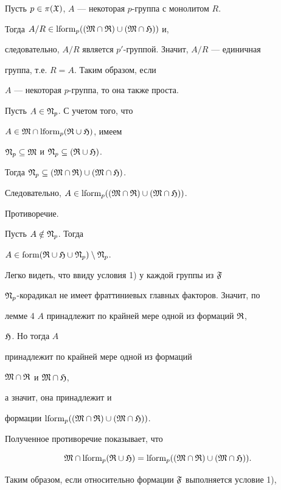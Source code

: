 \begin{pf}
Пусть $p\in\pi(\frak X)$, $A$ --- некоторая $p$-группа с монолитом $R$. 


Тогда $A/R\in\operatorname{lform}_p((\frak M\cap\frak R)\cup(\frak M\cap\frak H))$ и, 


следовательно, $A/R$ является $p'$-группой. Значит, $A/R$ --- единичная 


группа, т.е. $R=A$. Таким образом, если 


$A$ --- некоторая $p$-группа, то она также проста. 


 


Пусть $A\in\frak N_p$. С учетом того, что 


$A\in\frak M\cap\operatorname{lform}_p(\frak R\cup\frak H)$, имеем 


$\frak N_p\subseteq\frak M$ и $\frak N_p\subseteq(\frak R\cup\frak H)$. 


Тогда $\frak N_p\subseteq(\frak M\cap\frak R)\cup(\frak M\cap\frak H)$. 


Следовательно, $A\in\operatorname{lform}_p((\frak M\cap\frak R)\cup(\frak M\cap\frak H))$. 


Противоречие. 


 


Пусть $A\notin\frak N_p$. Тогда 


$A\in\operatorname{form}(\frak R\cup\frak H\cup\frak N_p)\setminus\frak N_p$. 


Легко видеть, что ввиду условия 1) у каждой группы из $\frak F$


$\frak N_p$-корадикал не имеет фраттиниевых главных факторов. Значит, по 


лемме 4 $A$ принадлежит по крайней мере одной из формаций $\frak R$, 


$\frak H$. Но тогда $A$ 


принадлежит по крайней мере одной из формаций


$\frak M\cap\frak R$ и $\frak M\cap\frak H$,


а значит, она принадлежит и 


формации $\operatorname{lform}_p((\frak M\cap\frak R)\cup(\frak M\cap\frak H))$. 


Полученное противоречие показывает, что 


$$ 


\frak M\cap\lform_p(\frak R\cup\frak H)= 


\lform_p((\frak M\cap\frak R)\cup(\frak M\cap\frak H)). 


$$ 


Таким образом, если относительно формации $\frak F$ выполняется условие 1), 



\end{pf}
